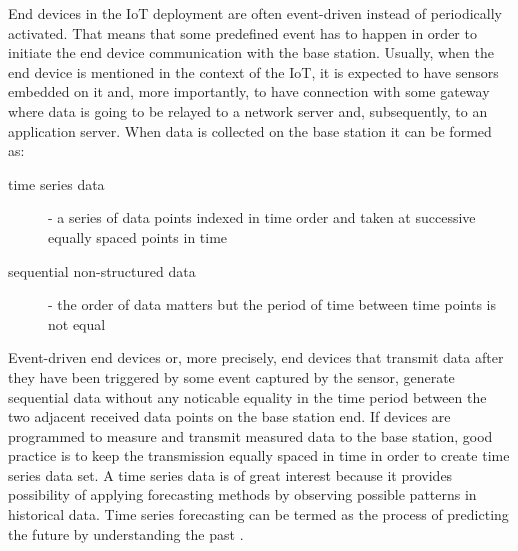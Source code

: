 End devices in the IoT deployment are often event-driven instead of periodically activated. 
That means that some predefined event has to happen in order to initiate the end device communication with the base station.
Usually, when the end device is mentioned in the context of the IoT, it is expected to have sensors embedded on it and, more importantly, to have connection with some gateway where data is going to be relayed to a network server and, subsequently, to an application server.
When data is collected on the base station it can be formed as:
\begin{description}
    \item[time series data] - a series of data points indexed in time order and taken at successive equally spaced points in time
    \item[sequential non-structured data] - the order of data matters but the period of time between time points is not equal 
\end{description}
Event-driven end devices or, more precisely, end devices that transmit data after they have been triggered by some event captured by the sensor, generate sequential data without any noticable equality in the time period between the two adjacent received data points on the base station end.
If devices are programmed to measure and transmit measured data to the base station, good practice is to keep the transmission equally spaced in time in order to create time series data set.
A time series data is of great interest because it provides possibility of applying forecasting methods by observing possible patterns in historical data. 
Time series forecasting can be termed as the process of predicting the future by understanding the past \cite{Raicharoen_timeseries}.

